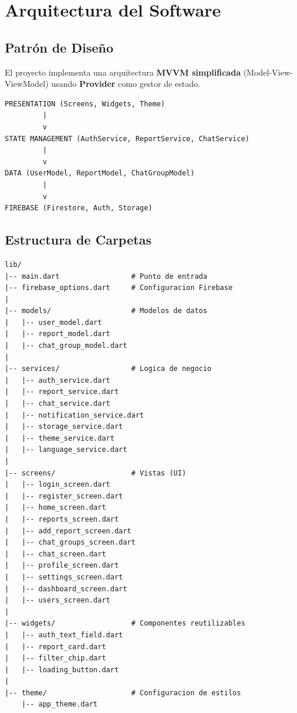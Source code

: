 \documentclass[12pt,a4paper]{article}
\begin{document}

\section{Arquitectura del Software}

\subsection{Patrón de Diseño}

El proyecto implementa una arquitectura \textbf{MVVM simplificada} (Model-View-ViewModel) usando \textbf{Provider} como gestor de estado.

\begin{lstlisting}[caption=Estructura de capas]
PRESENTATION (Screens, Widgets, Theme)
         |
         v
STATE MANAGEMENT (AuthService, ReportService, ChatService)
         |
         v
DATA (UserModel, ReportModel, ChatGroupModel)
         |
         v
FIREBASE (Firestore, Auth, Storage)
\end{lstlisting}

\subsection{Estructura de Carpetas}

\begin{lstlisting}[caption=Estructura del proyecto]
lib/
|-- main.dart                 # Punto de entrada
|-- firebase_options.dart     # Configuracion Firebase
|
|-- models/                   # Modelos de datos
|   |-- user_model.dart
|   |-- report_model.dart
|   |-- chat_group_model.dart
|
|-- services/                 # Logica de negocio
|   |-- auth_service.dart
|   |-- report_service.dart
|   |-- chat_service.dart
|   |-- notification_service.dart
|   |-- storage_service.dart
|   |-- theme_service.dart
|   |-- language_service.dart
|
|-- screens/                  # Vistas (UI)
|   |-- login_screen.dart
|   |-- register_screen.dart
|   |-- home_screen.dart
|   |-- reports_screen.dart
|   |-- add_report_screen.dart
|   |-- chat_groups_screen.dart
|   |-- chat_screen.dart
|   |-- profile_screen.dart
|   |-- settings_screen.dart
|   |-- dashboard_screen.dart
|   |-- users_screen.dart
|
|-- widgets/                  # Componentes reutilizables
|   |-- auth_text_field.dart
|   |-- report_card.dart
|   |-- filter_chip.dart
|   |-- loading_button.dart
|
|-- theme/                    # Configuracion de estilos
    |-- app_theme.dart
\end{lstlisting}
\end{document}
